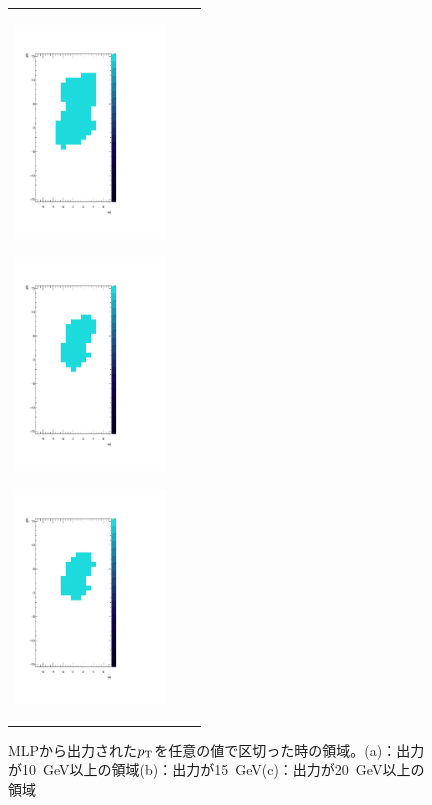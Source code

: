 \begin{figure}
    \centering
    \begin{tabular}{ccc}
    \centering
    \begin{minipage}[b]{0.33\hsize}%
        \centering
        \includegraphics[clip, width=4cm]{fig/4/cut1_output.pdf}
        \subcaption{}
        \label{cut1}
    \end{minipage}%
    \begin{minipage}[b]{0.33\hsize}%
        \centering
        \includegraphics[clip, width=4cm]{fig/4/cut2_output.pdf}
        \subcaption{}
        \label{cut2}
    \end{minipage}%
    \begin{minipage}[b]{0.33\hsize}%
        \centering
        \includegraphics[clip, width=4cm]{fig/4/cut3_output.pdf}
        \subcaption{}
        \label{cut3}
    \end{minipage}%
    \end{tabular}
    \caption{MLPから出力された$p_{\rm{T}}$を任意の値で区切った時の領域。(a)：出力が10~GeV以上の領域(b)：出力が15~GeV(c)：出力が20~GeV以上の領域}
    \label{ninninoCut}
\end{figure}

